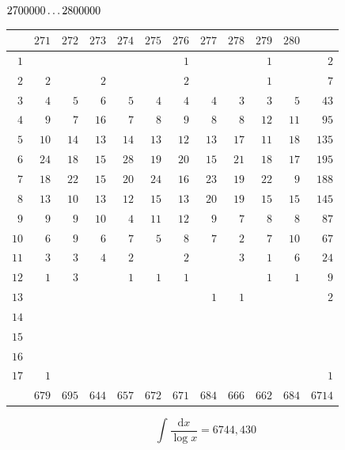 \par\medskip
\noindent\begin{minipage}{\linewidth}\centering
{}
\(2700000\mathinner{.\,.\,.}2800000\)\par\smallskip
\begingroup\fontsize{10.5}{11.5}\selectfont\setlength{\tabcolsep}{3.5pt}\renewcommand{\arraystretch}{1}
\begin{tabular}{r|rrrrrrrrrr|r}\hline
 & $271$ & $272$ & $273$ & $274$ & $275$ & $276$ & $277$ & $278$ & $279$ & $280$ &  \\ \hline
$1$ &  &  &  &  &  & $1$ &  &  & $1$ &  & $2$ \\
$2$ & $2$ &  & $2$ &  &  & $2$ &  &  & $1$ &  & $7$ \\
$3$ & $4$ & $5$ & $6$ & $5$ & $4$ & $4$ & $4$ & $3$ & $3$ & $5$ & $43$ \\
$4$ & $9$ & $7$ & $16$ & $7$ & $8$ & $9$ & $8$ & $8$ & $12$ & $11$ & $95$ \\
$5$ & $10$ & $14$ & $13$ & $14$ & $13$ & $12$ & $13$ & $17$ & $11$ & $18$ & $135$ \\
$6$ & $24$ & $18$ & $15$ & $28$ & $19$ & $20$ & $15$ & $21$ & $18$ & $17$ & $195$ \\
$7$ & $18$ & $22$ & $15$ & $20$ & $24$ & $16$ & $23$ & $19$ & $22$ & $9$ & $188$ \\
$8$ & $13$ & $10$ & $13$ & $12$ & $15$ & $13$ & $20$ & $19$ & $15$ & $15$ & $145$ \\
$9$ & $9$ & $9$ & $10$ & $4$ & $11$ & $12$ & $9$ & $7$ & $8$ & $8$ & $87$ \\
$10$ & $6$ & $9$ & $6$ & $7$ & $5$ & $8$ & $7$ & $2$ & $7$ & $10$ & $67$ \\
$11$ & $3$ & $3$ & $4$ & $2$ &  & $2$ &  & $3$ & $1$ & $6$ & $24$ \\
$12$ & $1$ & $3$ &  & $1$ & $1$ & $1$ &  &  & $1$ & $1$ & $9$ \\
$13$ &  &  &  &  &  &  & $1$ & $1$ &  &  & $2$ \\
$14$ &  &  &  &  &  &  &  &  &  &  &  \\
$15$ &  &  &  &  &  &  &  &  &  &  &  \\
$16$ &  &  &  &  &  &  &  &  &  &  &  \\
$17$ & $1$ &  &  &  &  &  &  &  &  &  & $1$ \\
\hline
 & $679$ & $695$ & $644$ & $657$ & $672$ & $671$ & $684$ & $666$ & $662$ & $684$ & $6714$ \\ \hline
\end{tabular}\par\endgroup
\setlength{\abovedisplayskip}{6pt}\setlength{\belowdisplayskip}{4pt}
\[\int\frac{\mathrm{d}x}{\log x}=6744{,}430\]
\end{minipage}\par

